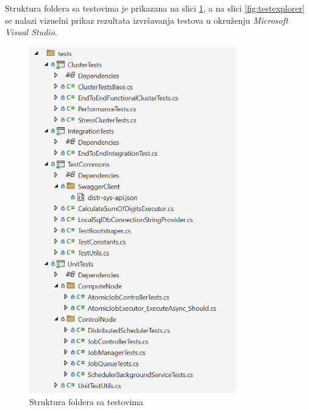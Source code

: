 \documentclass[12pt,oneside]{memoir}
\begin{document}
Struktura foldera sa testovima je prikazana na slici \ref{fig:testovi}, a na slici \ref{fig:testexplorer} se nalazi vizuelni prikaz rezultata izvršavanja testova u okruženju \emph{Microsoft Visual Studio}.

\begin{figure}[!ht]
  \centering
  \includegraphics[width=0.8\textwidth]{./images/testovi.png}
  \caption{Struktura foldera sa testovima}
  \label{fig:testovi}
\end{figure}
\end{document}
